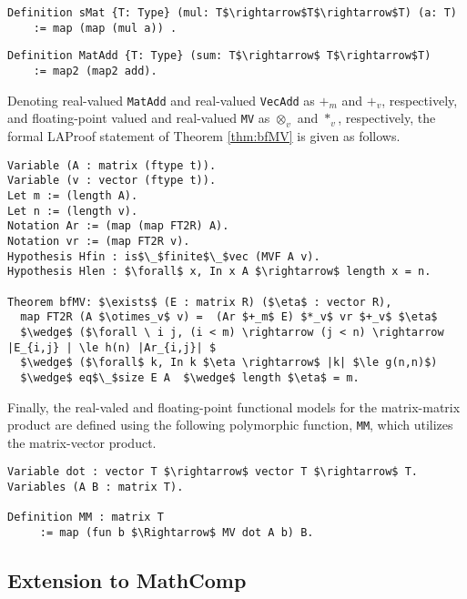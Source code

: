 \begin{lstlisting}
Definition sMat {T: Type} (mul: T$\rightarrow$T$\rightarrow$T) (a: T)
    := map (map (mul a)) .
\end{lstlisting}

\begin{lstlisting}
Definition MatAdd {T: Type} (sum: T$\rightarrow$ T$\rightarrow$T)
    := map2 (map2 add). 
\end{lstlisting}
 
 Denoting real-valued \lstinline{MatAdd} and real-valued \lstinline{VecAdd} as $+_m$ and $+_v$,  respectively,  and floating-point valued and real-valued \lstinline{MV} as $\otimes_v$ and $*_v$,  respectively,  the formal LAProof statement of Theorem \ref{thm:bfMV} is given as follows. 

\begin{lstlisting}
Variable (A : matrix (ftype t)).
Variable (v : vector (ftype t)).
Let m := (length A).
Let n := (length v).
Notation Ar := (map (map FT2R) A).
Notation vr := (map FT2R v).
Hypothesis Hfin : is$\_$finite$\_$vec (MVF A v).
Hypothesis Hlen : $\forall$ x, In x A $\rightarrow$ length x = n.

Theorem bfMV: $\exists$ (E : matrix R) ($\eta$ : vector R),
  map FT2R (A $\otimes_v$ v) =  (Ar $+_m$ E) $*_v$ vr $+_v$ $\eta$ 
  $\wedge$ ($\forall \ i j, (i < m) \rightarrow (j < n) \rightarrow |E_{i,j} | \le h(n) |Ar_{i,j}| $
  $\wedge$ ($\forall$ k, In k $\eta \rightarrow$ |k| $\le g(n,n)$) 
  $\wedge$ eq$\_$size E A  $\wedge$ length $\eta$ = m.
 \end{lstlisting}
 
 Finally, the real-valed and floating-point functional models for the matrix-matrix product are defined using the following polymorphic function, \lstinline{MM}, which utilizes the matrix-vector product.
\begin{lstlisting}
Variable dot : vector T $\rightarrow$ vector T $\rightarrow$ T. 
Variables (A B : matrix T).

Definition MM : matrix T 
     := map (fun b $\Rightarrow$ MV dot A b) B.
 \end{lstlisting}
 
 \subsection{Extension to MathComp}
 
